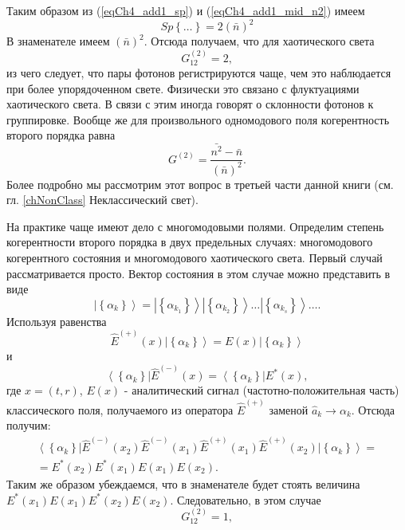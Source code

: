 Таким образом из (\ref{eqCh4_add1_sp}) и (\ref{eqCh4_add1_mid_n2}) имеем
\[
Sp\left\{\dots\right\} = 2\left(\bar{n}\right)^2
\] 
В знаменателе имеем  $\left(\bar{n}\right)^2$. Отсюда получаем, что
для хаотического света 
\begin{equation}
G_{12}^{(2)} = 2,
\label{eqCh4_27}
\end{equation}
из чего следует, что пары фотонов регистрируются чаще, чем это
наблюдается при более упорядоченном свете. Физически это
связано с флуктуациями хаотического света. В связи с этим
иногда говорят о склонности фотонов к группировке. Вообще же
для произвольного одномодового поля когерентность второго
порядка равна 
\begin{equation}
G^{(2)} = \frac{\bar{n^2} - \bar{n}}{\left(\bar{n}\right)^2}.
\label{eqCh4_28}
\end{equation}
Более подробно мы рассмотрим этот вопрос в третьей части данной книги
(см. гл. \ref{chNonClass} Неклассический свет).

На практике чаще имеют дело с многомодовыми полями. Определим степень
когерентности второго порядка в двух предельных случаях:
многомодового когерентного состояния и многомодового
хаотического света. Первый случай рассматривается
просто. Вектор состояния в этом случае можно представить в
виде  
\begin{equation}
\left|\left\{\alpha_k\right\}\right> = 
\left|\left\{\alpha_{k_1}\right\}\right>
\left|\left\{\alpha_{k_2}\right\}\right>
\dotsc
\left|\left\{\alpha_{k_s}\right\}\right>
\dots.
\label{eqCh4_29}
\end{equation}
Используя равенства 
\[
\hat{E}^{(+)}\left(x\right)\left|\left\{\alpha_k\right\}\right> = 
E\left(x\right)\left|\left\{\alpha_k\right\}\right>
\]
и
\[
\left<\left\{\alpha_k\right\}\right|\hat{E}^{(-)}\left(x\right) = 
\left<\left\{\alpha_k\right\}\right|E^{*}\left(x\right),
\]
где $x = \left(t, r\right)$, $E\left(x\right)$ - аналитический сигнал
(частотно-положительная часть) классического поля, получаемого из
оператора $\hat{E}^{(+)}$ заменой $\hat{a}_k \rightarrow
\alpha_k$. Отсюда получим:
\begin{eqnarray}
\left<\left\{\alpha_k\right\}\right|\hat{E}^{(-)}\left(x_2\right)
\hat{E}^{(-)}\left(x_1\right)\hat{E}^{(+)}\left(x_1\right)
\hat{E}^{(+)}\left(x_2\right)\left|\left\{\alpha_k\right\}\right> = 
\nonumber \\
= E^{*}\left(x_2\right)E^{*}\left(x_1\right)
E\left(x_1\right)E\left(x_2\right).
\nonumber
\end{eqnarray}
Таким же образом убеждаемся, что в знаменателе будет стоять величина  
$E^{*}\left(x_1\right)E\left(x_1\right)
E^{*}\left(x_2\right)
E\left(x_2\right)$. Следовательно, в этом случае
\begin{equation}
G_{12}^{(2)} = 1,
\label{eqCh4_30}
\end{equation}

